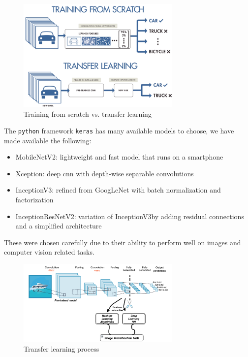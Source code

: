 \documentclass[twocolumn]{article}
\newcommand{\mobilenet}{MobileNetV2}
\newcommand{\xception}{Xception}
\newcommand{\inception}{InceptionV3}
\newcommand{\resnet}{InceptionResNetV2}
\begin{document}
\begin{figure}[h]
\centering
\includegraphics[width=8cm]{./figures/training from scratch vs. transfer learning}
\caption{Training from scratch vs. transfer learning}
\end{figure}

The \texttt{python} framework \texttt{keras} has many available models to 
choose, we have made available the following:
\begin{itemize}
  \item \mobilenet: lightweight and fast model that runs on a smartphone
  \cite{sandler2018mobilenetv2}
  \item \xception: deep \gls{cnn} with depth-wise separable convolutions
  \cite{chollet2017xception}
  \item \inception: refined from GoogLeNet with batch normalization and 
  factorization \cite{szegedy2016rethinking}
  \item \resnet: variation of \inception by adding residual connections and a 
  simplified architecture \cite{szegedy2017inception}
\end{itemize}

These were chosen carefully due to their ability to perform well on images and 
computer vision related tasks.

\begin{figure}[h]
\centering
\includegraphics[width=8cm]{./figures/transfer learning process}
\caption{Transfer learning process}
\end{figure}
\end{document}
